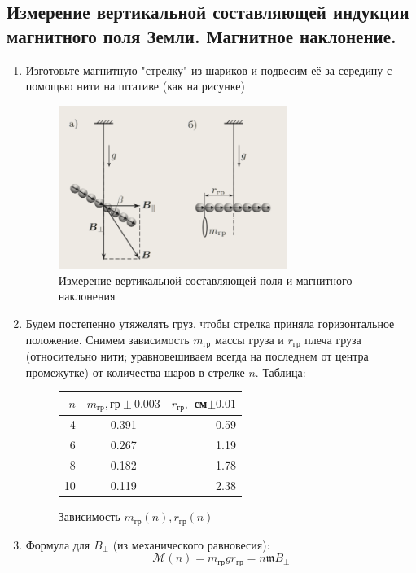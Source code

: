 \documentclass[12pt,a4paper]{article}
\newcommand{\mk}{\mathfrak}
\begin{document}
\subsection{Измерение вертикальной составляющей индукции магнитного поля
Земли. Магнитное наклонение.}
\begin{enumerate}
  \item Изготовьте магнитную "стрелку" из шариков и подвесим её за середину с помощью нити на штативе  (как на рисунке)
  \begin{figure}[H]
    \includegraphics*[width=0.7\textwidth]{2023-10-02-17-36-48.png}
    \caption{Измерение вертикальной составляющей поля и магнитного наклонения}
  \end{figure}
  \item Будем постепенно утяжелять груз, чтобы стрелка приняла горизонтальное положение. Снимем зависимость $m_\text{гр}$ массы груза и $r_\text{гр}$ плеча груза (относительно нити; уравновешиваем всегда на последнем от центра промежутке) от количества шаров в стрелке $n$. Таблица:
  \begin{figure}[H]
    \begin{tabular}{|r|c|r|}
       $n$ & $m_\text{гр}, \text{гр} \pm 0.003$ &$r_\text{гр},$ см$\pm 0.01$\\
      \midrule
       4 & 0.391 & 0.59\\
       6 & 0.267 & 1.19\\
       8 & 0.182 & 1.78\\
      10 & 0.119 & 2.38\\
    \end{tabular}
    \caption{Зависимость $m_\text{гр}(n), r_\text{гр}(n)$}      
  \end{figure}
  \item Формула для $B_\bot$ \scriptsize(из механического равновесия)\normalsize:
  $$\mathcal{M}(n) = m_\text{гр}gr_\text{гр} = n \mk m B_\bot$$

\end{enumerate}
\end{document}

